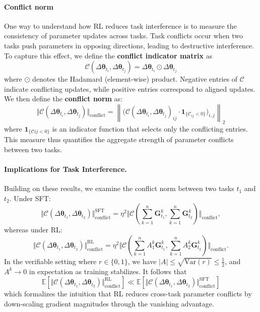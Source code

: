 \documentclass{article} %
\begin{document}
\paragraph{Conflict norm} One way to understand how RL reduces task interference is to measure the consistency of parameter updates across tasks. Task conflicts occur when two tasks push parameters in opposing directions, leading to destructive interference. To capture this effect, we define the \textbf{conflict indicator matrix} as
\begin{equation}
    \mathcal{C}(\Delta \bm{\theta}_{t_i}, \Delta \bm{\theta}_{t_j}) = \Delta \bm{\theta}_{t_i}\odot\Delta \bm{\theta}_{t_j}
\end{equation}
where $\odot$ denotes the Hadamard (element-wise) product. Negative entries of $\mathcal{C}$ indicate conflicting updates, while positive entries correspond to aligned updates. We then define the \textbf{conflict norm} as:
\begin{equation}
    \Vert \mathcal{C}(\Delta \bm{\theta}_{t_i}, \Delta \bm{\theta}_{t_j})\Vert_{\text{conflict}} = \left\| \big( \mathcal{C}(\Delta \bm{\theta}_{t_i}, \Delta \bm{\theta}_{t_j})_{ij} \cdot \mathbf{1}_{\{\mathcal{C}_{ij} < 0\}} \big)_{i,j} \right\|_2
\end{equation}
where $\mathbf{1}_{\{\mathcal{C}{ij} < 0\}}$ is an indicator function that selects only the conflicting entries. This measure thus quantifies the aggregate strength of parameter conflicts between two tasks.



\paragraph{Implications for Task Interference.}
Building on these results, we examine the conflict norm between two tasks $t_1$ and $t_2$. Under SFT:
\[
\Vert \mathcal{C}(\Delta \bm{\theta}_{t_1}, \Delta \bm{\theta}_{t_2})\Vert_{\text{conflict}}^{\text{SFT}}
= \eta^2 \Vert\mathcal{C}(\sum_{k=1}^n \bm{G}_{t_1}^k, \sum_{k=1}^n \bm{G}_{t_2}^k)\Vert_{\text{conflict}},
\]
whereas under RL:
\[
\Vert \mathcal{C}(\Delta \bm{\theta}_{t_1}, \Delta \bm{\theta}_{t_2}) \Vert_{\text{conflict}}^{\text{RL}}
= \eta^2 \Vert \mathcal{C}(\sum_{k=1}^n A_1^k \bm{G}_{t_1}^k, \sum_{k=1}^n A_2^k \bm{G}_{t_2}^k) \Vert_{\text{conflict}}.
\]
In the verifiable setting where $r \in \{0,1\}$, we have $|A| \le \sqrt{\mathrm{Var}(r)} \le \tfrac{1}{2}$, and $A^k \to 0$ in expectation as training stabilizes. It follows that
\begin{equation}
\mathbb{E}\!\left[ \Vert \mathcal{C}(\Delta \bm{\theta}_{t_1}, \Delta \bm{\theta}_{t_2})\Vert_{\text{conflict}}^{\text{RL}} \right]
\ll 
\mathbb{E}\!\left[ \Vert\mathcal{C}(\Delta \bm{\theta}_{t_1}, \Delta \bm{\theta}_{t_2}) \Vert_{\text{conflict}}^{\text{SFT}} \right]     
\end{equation}
which formalizes the intuition that RL reduces cross-task parameter conflicts by down-scaling gradient magnitudes through the vanishing advantage. 
\end{document}
